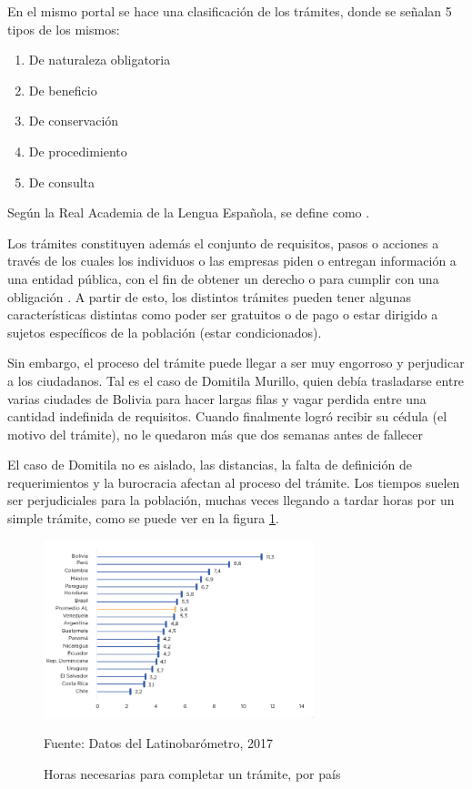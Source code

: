 En el mismo portal se hace una clasificación de los trámites, donde se señalan 5
tipos de los mismos:

\begin{enumerate}
    \item De naturaleza obligatoria
    \item De beneficio
    \item De conservación
    \item De procedimiento
    \item De consulta
\end{enumerate}

Según la Real Academia de la Lengua Española, se define como 
\parencite{asaleDiccionarioLenguaEspanola}.

Los trámites constituyen además el conjunto de requisitos, pasos o acciones a
través de los cuales los individuos o las empresas piden o entregan información
a una entidad pública, con el fin de obtener un derecho o para cumplir con una
obligación \cite{rosethFinTramiteEterno2018}. A partir de esto, los distintos
trámites pueden tener algunas características distintas como poder ser gratuitos
o de pago o estar dirigido a sujetos específicos de la población (estar
condicionados).

Sin embargo, el proceso del trámite puede llegar a ser muy engorroso y
perjudicar a los ciudadanos. Tal es el caso de Domitila Murillo, quien debía
trasladarse entre varias ciudades de Bolivia para hacer largas filas y vagar
perdida entre una cantidad indefinida de requisitos. Cuando finalmente logró
recibir su cédula (el motivo del trámite), no le quedaron más que dos semanas
antes de fallecer \cite{charoskyquejatramite}

El caso de Domitila no es aislado, las distancias, la falta de definición de
requerimientos y la burocracia afectan al proceso del trámite. Los tiempos
suelen ser perjudiciales para la población, muchas veces llegando a tardar horas
por un simple trámite, como se puede ver en la figura \ref{fig:horastramite}.

\begin{figure}[htbp]
    \centering
    \includegraphics[width=0.7\textwidth]{assets/horastramite}
    \caption{Horas necesarias para completar un trámite, por país}{Fuente: Datos del Latinobarómetro, 2017}
    \label{fig:horastramite}
\end{figure}

